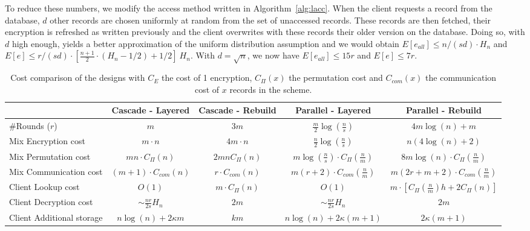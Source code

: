 \documentclass{llncs}
\begin{document}
To reduce these numbers, we modify the access method written in Algorithm~\ref{alg:lacc}. When the client requests a record from the database, $d$ other records are chosen uniformly at random from the set of unaccessed records. These records are then fetched, their encryption is refreshed as written previously and the client overwrites with these records their older version on the database. Doing so, with $d$ high enough, yields a better approximation of the uniform distribution assumption and we would obtain  $E[e_{all}]\leq n/(sd) \cdot H_n $ and $E[e] \leq {r/(sd)} \cdot \left [ \frac{n+1}{2}\cdot(H_n-1/2)+1/2 \right ] \ H_n$.
With $d=\sqrt n$, we now have $E[e_{all}]\leq 15 r$ and $E[e]\leq 7r$.

\begin{table*}
\centering
\begin{tabular}{l *4c}
\toprule
    					& Cascade - Layered	 			& Cascade - Rebuild							& Parallel - Layered 						& Parallel - Rebuild\\
\midrule
\#Rounds ($r$) & $m$ & $3m$ & $\frac{m}{2} \log\left( \frac{n}{s}\right)$ &  $4m\log(n) +  m$ \\
Mix Encryption cost & $m \cdot  n$ & $4m  \cdot  n$ & $\frac{n}{2} \log\left (\frac{n}{s}\right)$ & $n(4\log(n) + 2) $ \\
Mix Permutation cost & $m n \cdot C_{\Pi}(n)$ & $2 m n C_{\Pi}(n)$ & $m \log\left (\frac{n}{s}\right)\cdot C_{\Pi}\left(\frac{n}{m}\right)$ & $8m\log(n) \cdot C_{\Pi}\left ( \frac{n}{m} \right )$ \\
Mix Communication cost & $(m+1) \cdot C_{com}(n)$ & $r \cdot C_{com}(n)$ & $m(r+2) \cdot C_{com}\left(\frac{n}{m}\right)$ & $m(2r+m+2) \cdot C_{com}\left(\frac{n}{m}\right)$\\
Client Lookup cost & $O(1)$ & $m\cdot C_{\Pi}(n)$ & $O(1)$ & $m \cdot [C_{\Pi}\left ( \frac{n}{m}\right )h+ 2C_{\Pi}(n)]$\\
Client Decryption cost & $\sim \frac{nr}{2s} H_n$ & $2m$ & $\sim \frac{nr}{2s} H_n$ & $2m$\\
Client Additional storage & $n\log(n)+ 2 \kappa m$ & $km$ &$n\log(n)+ 2 \kappa  (m+1)$ & $2 \kappa  (m+1)$ \\
\bottomrule
\end{tabular}
\centering
\caption{Cost comparison of the designs with $C_{E}$ the cost of 1 encryption, $C_{\Pi}(x)$ the permutation cost and $C_{com}(x)$ the communication cost of $x$ records in the scheme.}
\end{table*}
\end{document}
